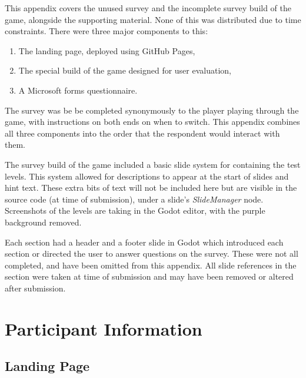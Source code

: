 
This appendix covers the unused survey and the incomplete survey build of the game, alongside the supporting material. None of this was distributed due to time constraints. There were three major components to this:

\begin{enumerate}
    \item The landing page, deployed using GitHub Pages,
    \item The special build of the game designed for user evaluation,
    \item A Microsoft forms questionnaire. 
\end{enumerate}

The survey was be be completed synonymously to the player playing through the game, with instructions on both ends on when to switch. This appendix combines all three components into the order that the respondent would interact with them.

The survey build of the game included a basic slide system for containing the test levels. This system allowed for descriptions to appear at the start of slides and hint text. These extra bits of text will not be included here but are visible in the source code (at time of submission), under a slide's \textit{SlideManager} node. Screenshots of the levels are taking in the Godot editor, with the purple background removed.

Each section had a header and a footer slide in Godot which introduced each section or directed the user to answer questions on the survey. These were not all completed, and have been omitted from this appendix. All slide references in the section were taken at time of submission and may have been removed or altered after submission.

\section{Participant Information}

\subsection{Landing Page}

